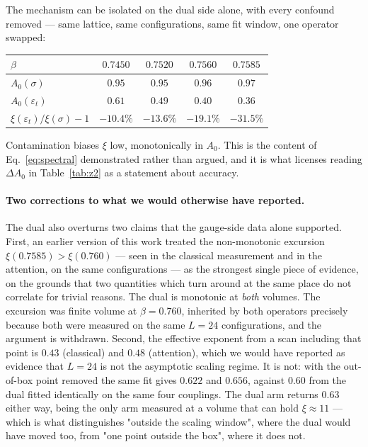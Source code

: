 \documentclass[aps,prl,reprint,superscriptaddress,nofootinbib]{revtex4-2}
\begin{document}
The mechanism can be isolated on the dual side alone, with every confound
removed --- same lattice, same configurations, same fit window, one operator
swapped:
\begin{center}\footnotesize
\begin{tabular}{@{}lcccc@{}}
\toprule
$\beta$ & $0.7450$ & $0.7520$ & $0.7560$ & $0.7585$\\
\midrule
$A_0(\sigma)$ & $0.95$ & $0.95$ & $0.96$ & $0.97$\\
$A_0(\varepsilon_t)$ & $0.61$ & $0.49$ & $0.40$ & $0.36$\\
$\xi(\varepsilon_t)/\xi(\sigma)-1$
  & $-10.4\%$ & $-13.6\%$ & $-19.1\%$ & $-31.5\%$\\
\bottomrule
\end{tabular}
\end{center}
Contamination biases $\xi$ low, monotonically in $A_0$. This is the content of
Eq.~\eqref{eq:spectral} demonstrated rather than argued, and it is what licenses
reading $\Delta A_0$ in Table~\ref{tab:z2} as a statement about accuracy.

\paragraph{Two corrections to what we would otherwise have reported.} The dual
also overturns two claims that the gauge-side data alone supported. First, an
earlier version of this work treated the non-monotonic excursion
$\xi(0.7585)>\xi(0.760)$ --- seen in the classical measurement and in the
attention, on the same configurations --- as the strongest single piece of
evidence, on the grounds that two quantities which turn around at the same place
do not correlate for trivial reasons. The dual is monotonic at \emph{both}
volumes. The excursion was finite volume at $\beta=0.760$, inherited by both
operators precisely because both were measured on the same $L=24$
configurations, and the argument is withdrawn. Second, the effective exponent
from a scan including that point is $0.43$ (classical) and $0.48$ (attention),
which we would have reported as evidence that $L=24$ is not the asymptotic
scaling regime. It is not: with the out-of-box point removed the same fit gives
$0.622$ and $0.656$, against $0.60$ from the dual fitted identically on the same
four couplings. The dual arm returns $0.63$ either way, being the only arm
measured at a volume that can hold $\xi\approx11$ --- which is what distinguishes
"outside the scaling window", where the dual would have moved too, from "one
point outside the box", where it does not.
\end{document}
